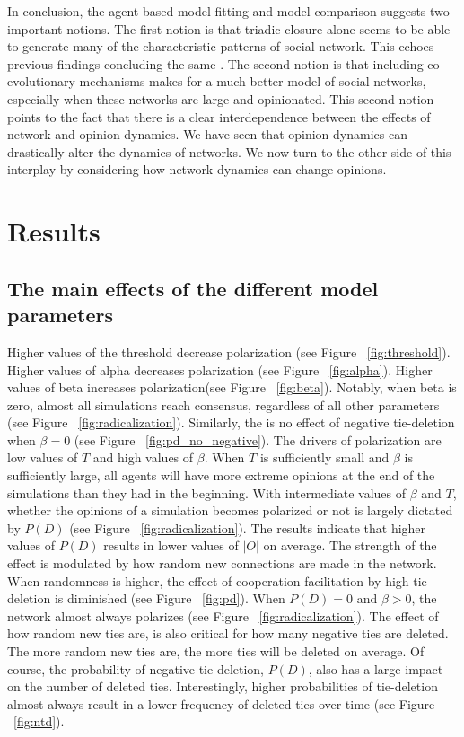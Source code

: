 \documentclass{article}
\begin{document}
In conclusion, the agent-based model fitting and model comparison suggests two important notions. The first notion is that triadic closure alone seems to be able to generate many of the characteristic patterns of social network. This echoes previous findings concluding the same \cite{ilany_social_2016,jackson_meeting_2007, jackson_search_2004}. The second notion is that including co-evolutionary mechanisms makes for a much better model of social networks, especially when these networks are large and opinionated. 
This second notion points to the fact that there is a clear interdependence between the effects of network and opinion dynamics. We have seen that opinion dynamics can drastically alter the dynamics of networks. We now turn to the other side of this interplay by considering how network dynamics can change opinions.

\section{Results}

\subsection{The main effects of the different model parameters}

Higher values of the threshold decrease polarization (see Figure ~\ref{fig:threshold}). Higher values of alpha decreases polarization (see Figure ~\ref{fig:alpha}). Higher values of beta increases polarization(see Figure ~\ref{fig:beta}). Notably, when beta is zero, almost all simulations reach consensus, regardless of all other parameters (see Figure ~\ref{fig:radicalization}). Similarly, the is no effect of negative tie-deletion when $\beta = 0$ (see Figure ~\ref{fig:pd_no_negative}). 
The drivers of polarization are low values of $T$ and high values of $\beta$. When $T$ is sufficiently small and $\beta$ is sufficiently large, all agents will have more extreme opinions at the end of the simulations than they had in the beginning. With intermediate values of $\beta$ and $T$, whether the opinions of a simulation becomes polarized or not is largely dictated by $P(D)$ (see Figure ~\ref{fig:radicalization}). 
The results indicate that higher values of $P(D)$ results in lower values of $|O|$ on average. 
The strength of the effect is modulated by how random new connections are made in the network. 
When randomness is higher, the effect of cooperation facilitation by high tie-deletion is diminished (see Figure ~\ref{fig:pd}). 
When $P(D) = 0$ and $\beta > 0$, the network almost always polarizes (see Figure ~\ref{fig:radicalization}).
The effect of how random new ties are, is also critical for how many negative ties are deleted. 
The more random new ties are, the more ties will be deleted on average. Of course, the probability of negative tie-deletion, $P(D)$, also has a large impact on the number of deleted ties. 
Interestingly, higher probabilities of tie-deletion almost always result in a lower frequency of deleted ties over time (see Figure ~\ref{fig:ntd}).
\end{document}
